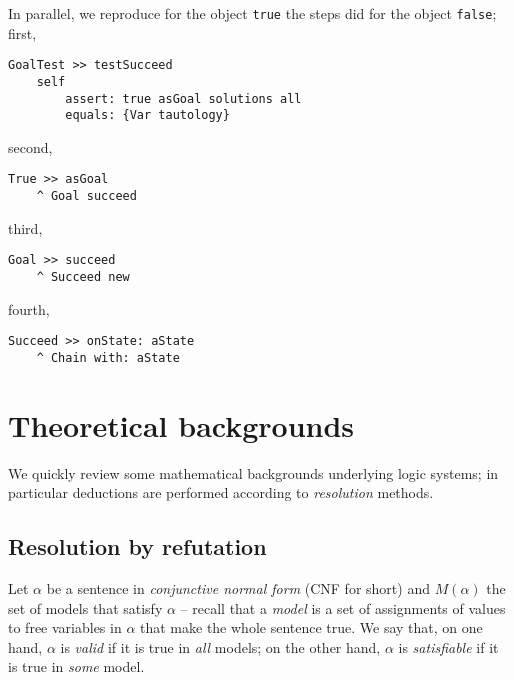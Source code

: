 \documentclass[a4paper,11pt]{article}
\begin{document}
In parallel, we reproduce for the object \Verb|true| the steps did for
the object \Verb|false|; first,
\begin{verbatim}
GoalTest >> testSucceed
    self
        assert: true asGoal solutions all
        equals: {Var tautology}
\end{verbatim}
second,
\begin{verbatim}
True >> asGoal
    ^ Goal succeed
\end{verbatim}
third,
\begin{verbatim}
Goal >> succeed
    ^ Succeed new
\end{verbatim}
fourth,
\begin{verbatim}
Succeed >> onState: aState
    ^ Chain with: aState
\end{verbatim}

\section{Theoretical backgrounds}

We quickly review some mathematical backgrounds underlying logic systems;
in particular deductions are performed according to \emph{resolution} methods.

\subsection{Resolution by refutation}

Let $\alpha$ be a sentence in \emph{conjunctive normal
form} (CNF for short) and $M(\alpha)$ the set of models that satisfy $\alpha$
-- recall that a \emph{model} is a set of assignments of values to free
variables in $\alpha$ that make the whole sentence true.  We say that, on one
hand, $\alpha$ is \textit{valid} if it is true in \textit{all} models; on the
other hand, $\alpha$ is \textit{satisfiable} if it is true in \textit{some}
model.
\end{document}
